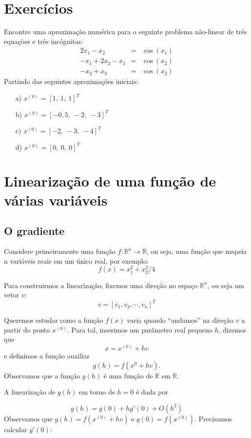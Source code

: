 \documentclass[main.tex]{subfiles}
\begin{document}
\section*{Exercícios}

\begin{Exercise} Encontre uma aproximação numérica para o seguinte problema não-linear de três equações e três incógnitas:
\begin{eqnarray*}
2x_1-x_2&=&\cos(x_1)\\
-x_1+2x_2-x_3&=&\cos(x_2)\\
-x_2+	x_3&=&\cos(x_3)
\end{eqnarray*}
Partindo das seguintes aproximações iniciais:
\begin{itemize}
\item[a)] $x^{(0)}=[1,~1,~1]^T$
\item[b)] $x^{(0)}=[-0,5,~-2,~-3]^T$
\item[c)] $x^{(0)}=[-2,~-3,~-4]^T$
\item[d)] $x^{(0)}=[0,~0,~0]^T$
\end{itemize}
\end{Exercise}


\section{Linearização de uma função de várias variáveis}

\subsection{O gradiente}

Considere primeiramente uma função $f:\mathbb{R}^n\to \mathbb{R}$, ou seja, uma função que mapeia n variáveis reais em um único real, por exemplo:
$$f(x)=x_1^2+x_2^2/4$$

Para construirmos a linearização, fixemos uma direção no espaço $\mathbb{R}^n$, ou seja um vetor $v$:
$$v=[v_1,  v_2,  \cdots,  v_n]^T$$

Queremos estudar como a função $f(x)$ varia quando ``andamos'' na direção $v$ a partir do ponto $x^{(0)}$. Para tal, inserimos um parâmetro  real pequeno $h$, dizemos que $$x=x^{(0)}+hv$$ e definimos a função auxiliar
$$g(h)=f(x^{0}+hv).$$
Observamos que a função $g(h)$ é uma função de $\mathbb{R}$ em $\mathbb{R}$.



A linearização de $g(h)$ em torno de $h=0$ é dada por

$$g(h)=g(0) + hg'(0) +O(h^2)$$
Observamos que $g(h)=f(x^{(0)}+hv)$ e $g(0)=f(x^{(0)})$. Precisamos calcular $g'(0)$:
\end{document}

